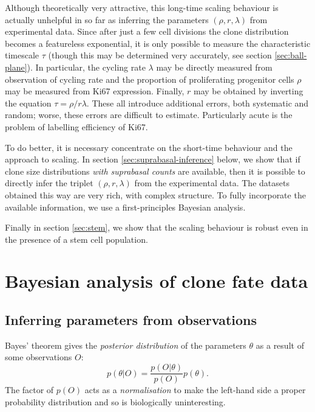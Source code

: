 \documentclass[10pt,UKenglish]{article}
\begin{document}
Although theoretically very attractive, this long-time scaling behaviour is actually unhelpful in so far as inferring the parameters $(\rho, r, \lambda)$ from experimental data. Since after just a few cell divisions the clone distribution becomes a featureless exponential, it is only possible to measure the characteristic timescale $\tau$ (though this may be determined very accurately, see section \ref{sec:ball-plane}). In particular, the cycling rate $\lambda$ may be directly measured from observation of cycling rate and the proportion of proliferating progenitor cells $\rho$ may be measured from Ki67 expression. Finally, $r$ may be obtained by inverting the equation $\tau = \rho/r\lambda$. These all introduce additional errors, both systematic and random; worse, these errors are difficult to estimate. Particularly acute is the problem of labelling efficiency of Ki67.

To do better, it is necessary concentrate on the short-time behaviour and the approach to scaling. In section \ref{sec:suprabasal-inference} below, we show that if clone size distributions \emph{with suprabasal counts} are available, then it is possible to directly infer the triplet $(\rho, r, \lambda)$ from the experimental data. The datasets obtained this way are very rich, with complex structure. To fully incorporate the available information, we use a first-principles Bayesian analysis.

Finally in section \ref{sec:stem}, we show that the scaling behaviour is robust even in the presence of a stem cell population.

\section{\label{sec:suprabasal-inference}Bayesian analysis of clone fate data}


\subsection{Inferring parameters from observations}

Bayes' theorem gives the \emph{posterior distribution} of the parameters $\theta$ as a result of some observations $O$: $$p(\theta|O) = \frac{p(O|\theta)}{p(O)} p(\theta).$$ The factor of $p(O)$ acts as a \emph{normalisation} to make the left-hand side a proper probability distribution and so is biologically uninteresting. 
\end{document}
